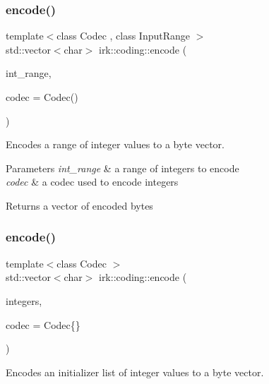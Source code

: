 \subsubsection{\texorpdfstring{encode()}{encode()}\hspace{0.1cm}{\footnotesize\ttfamily [2/3]}}
{\footnotesize\ttfamily template$<$class Codec , class Input\+Range $>$ \\
std\+::vector$<$char$>$ irk\+::coding\+::encode (\begin{DoxyParamCaption}\item[{const Input\+Range \&}]{int\+\_\+range,  }\item[{const Codec \&}]{codec = {\ttfamily Codec()} }\end{DoxyParamCaption})}



Encodes a range of integer values to a byte vector. 


\begin{DoxyParams}{Parameters}
{\em int\+\_\+range} & a range of integers to encode \\
\hline
{\em codec} & a codec used to encode integers \\
\hline
\end{DoxyParams}
\begin{DoxyReturn}{Returns}
a vector of encoded bytes 
\end{DoxyReturn}
\mbox{\label{namespaceirk_1_1coding_a5a8bcf925049c4f53e3912ed177cd8cc}} 
\subsubsection{\texorpdfstring{encode()}{encode()}\hspace{0.1cm}{\footnotesize\ttfamily [3/3]}}
{\footnotesize\ttfamily template$<$class Codec $>$ \\
std\+::vector$<$char$>$ irk\+::coding\+::encode (\begin{DoxyParamCaption}\item[{std\+::initializer\+\_\+list$<$ typename Codec\+::value\+\_\+type $>$}]{integers,  }\item[{const Codec \&}]{codec = {\ttfamily Codec\{\}} }\end{DoxyParamCaption})}



Encodes an initializer list of integer values to a byte vector. 


